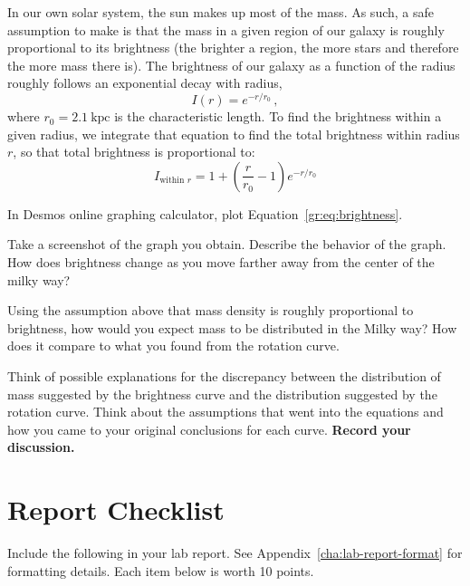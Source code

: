 In our own solar system, the sun makes up most of the mass. As such, a safe assumption to make is that the mass in a given region of our galaxy is roughly proportional to its brightness (the brighter a region, the more stars and therefore the more mass there is). The brightness of our galaxy as a function of the radius roughly follows an exponential decay with radius,
\begin{equation}
I(r) = e^{-r/r_0} \,,
\end{equation}
where $r_0 = 2.1\:\textrm{kpc}$ is the characteristic length. To find the brightness within a given radius, we integrate that equation to find the total brightness within radius $r$, so that total brightness is proportional to:
\begin{equation}\label{gr:eq:brightness}
I_{\textrm{within }r} = 1 + \left(\frac{r}{r_0} - 1\right) e^{-r/r_0}
\end{equation}

\begin{steps}
\item In Desmos online graphing calculator, plot Equation~\ref{gr:eq:brightness}.

\item Take a screenshot of the graph you obtain. Describe the behavior of the graph. How does brightness change as you move farther away from the center of the milky way?

\item Using the assumption above that mass density is roughly proportional to brightness, how would you expect mass to be distributed in the Milky way? How does it compare to what you found from the rotation curve.

\item Think of possible explanations for the discrepancy between the distribution of mass suggested by the brightness curve and the distribution suggested by the rotation curve. Think about the assumptions that went into the equations and how you came to your original conclusions for each curve. \textbf{Record your discussion.}

\end{steps}

\section{Report Checklist}

Include the following in your lab report. See Appendix~\ref{cha:lab-report-format} for formatting details. Each item below is worth 10 points.

